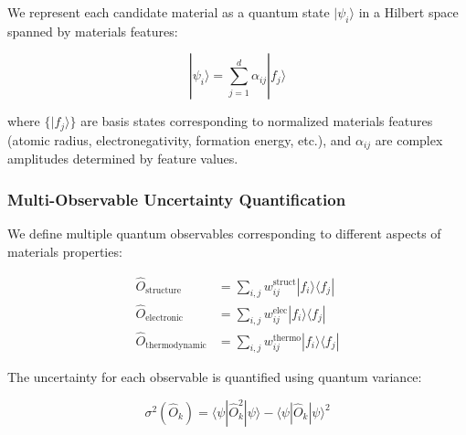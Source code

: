\documentclass[twocolumn]{article}
\begin{document}
We represent each candidate material as a quantum state $|\psi_i\rangle$ in a Hilbert space spanned by materials features:

\begin{equation}
|\psi_i\rangle = \sum_{j=1}^{d} \alpha_{ij} |f_j\rangle
\end{equation}

where $\{|f_j\rangle\}$ are basis states corresponding to normalized materials features (atomic radius, electronegativity, formation energy, etc.), and $\alpha_{ij}$ are complex amplitudes determined by feature values.

\subsubsection{Multi-Observable Uncertainty Quantification}

We define multiple quantum observables corresponding to different aspects of materials properties:

\begin{align}
\hat{O}_{\text{structure}} &= \sum_{i,j} w_{ij}^{\text{struct}} |f_i\rangle\langle f_j| \\
\hat{O}_{\text{electronic}} &= \sum_{i,j} w_{ij}^{\text{elec}} |f_i\rangle\langle f_j| \\
\hat{O}_{\text{thermodynamic}} &= \sum_{i,j} w_{ij}^{\text{thermo}} |f_i\rangle\langle f_j|
\end{align}

The uncertainty for each observable is quantified using quantum variance:

\begin{equation}
\sigma^2(\hat{O}_k) = \langle\psi|\hat{O}_k^2|\psi\rangle - \langle\psi|\hat{O}_k|\psi\rangle^2
\end{equation}
\end{document}
